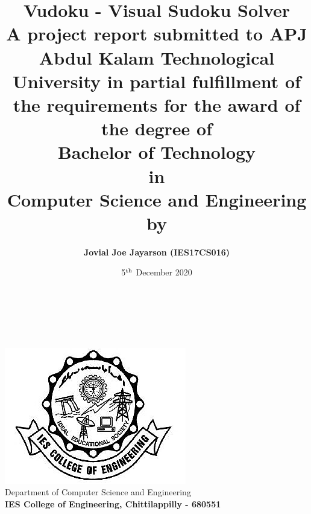 \documentclass[12pt, a4paper]{report}
\title{\textbf{Vudoku - Visual Sudoku Solver} \\ \vspace{1cm} \large A project report submitted to APJ Abdul Kalam Technological University in partial fulfillment of the requirements for the award of the degree of \\ \vspace{0.5cm} \large \textbf{Bachelor of Technology \\ in \\ Computer Science and Engineering} \\ \vspace{0.5cm} \large by}
\author{\textbf{Jovial Joe Jayarson (IES17CS016)}}
\date{5$^{\textnormal{th}}$ December 2020}
\begin{document}

\makeatletter
\thispagestyle{empty}
\begin{titlepage}
    \begin{center}
        \vspace*{\fill}
        {\huge \@title }\\[0.5cm]
        {\@author} \\[0.5cm]
        {\@date}\\[10ex]
        \includegraphics[width=0.5\linewidth]{iesce.png}\\[10ex]
        {\large Department of Computer Science and Engineering \\ \textbf{IES College of Engineering, Chittilappilly - 680551}}
        \vspace*{\fill}
    \end{center}
\end{titlepage}

\end{document}

